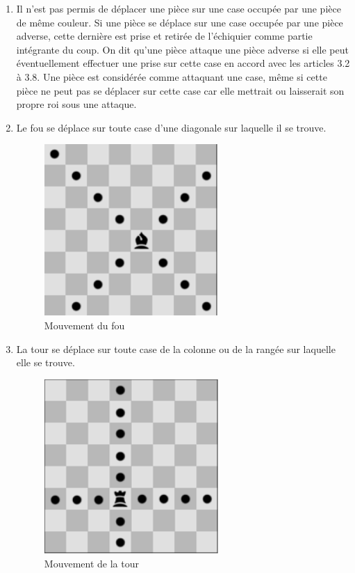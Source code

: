 \begin{enumerate}

\item Il n’est pas permis de déplacer une pièce sur une case occupée par une pièce de même couleur. Si une pièce se déplace sur une case occupée par une pièce adverse, cette dernière est prise et retirée de l’échiquier comme partie intégrante du coup. On dit qu’une pièce attaque une pièce adverse si elle peut éventuellement effectuer une prise sur cette case en accord avec les articles 3.2 à 3.8. Une pièce est considérée comme attaquant une case, même si cette pièce ne peut pas se déplacer sur cette case car elle mettrait ou laisserait son propre roi sous une attaque.

\item Le fou se déplace sur toute case d’une diagonale sur laquelle il se trouve.


\begin{figure}[H]
  \centering
  \includegraphics[scale=0.5]{fou.png}
  \caption{Mouvement du fou}
\end{figure}

\item La tour se déplace sur toute case de la colonne ou de la rangée sur laquelle elle se trouve.

\begin{figure}[H]
  \centering
  \includegraphics[scale=0.5]{tour.png}
  \caption{Mouvement de la tour}
\end{figure}


\end{enumerate}
